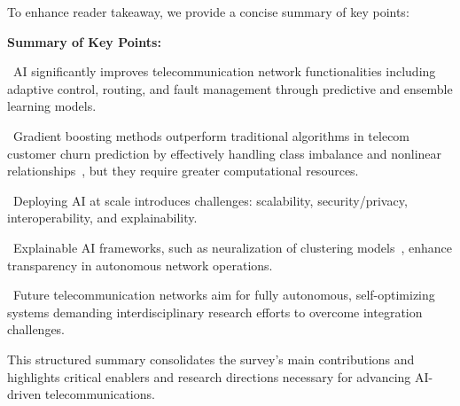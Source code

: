 \documentclass[sigconf]{acmart}
\begin{document}
To enhance reader takeaway, we provide a concise summary of key points:

\textbf{Summary of Key Points:}

\textbullet\ AI significantly improves telecommunication network functionalities including adaptive control, routing, and fault management through predictive and ensemble learning models.

\textbullet\ Gradient boosting methods outperform traditional algorithms in telecom customer churn prediction by effectively handling class imbalance and nonlinear relationships~\cite{ref17}, but they require greater computational resources.

\textbullet\ Deploying AI at scale introduces challenges: scalability, security/privacy, interoperability, and explainability.

\textbullet\ Explainable AI frameworks, such as neuralization of clustering models~\cite{ref45}, enhance transparency in autonomous network operations.

\textbullet\ Future telecommunication networks aim for fully autonomous, self-optimizing systems demanding interdisciplinary research efforts to overcome integration challenges.

This structured summary consolidates the survey's main contributions and highlights critical enablers and research directions necessary for advancing AI-driven telecommunications.



\end{document}
